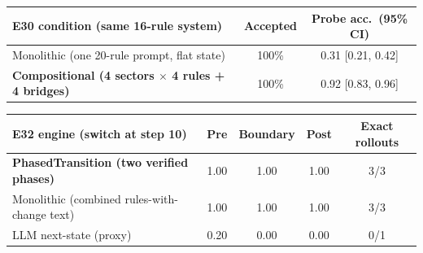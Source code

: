\begin{tabular}{lcc}
\toprule
E30 condition (same 16-rule system) & Accepted & Probe acc.\ (95\% CI) \\
\midrule
Monolithic (one 20-rule prompt, flat state) & 100\% & 0.31 [0.21, 0.42] \\
\textbf{Compositional (4 sectors $\times$ 4 rules + 4 bridges)} & 100\% & 0.92 [0.83, 0.96] \\
\bottomrule
\end{tabular}

\vspace{0.7em}

\begin{tabular}{lcccc}
\toprule
E32 engine (switch at step 10) & Pre & Boundary & Post & Exact rollouts \\
\midrule
\textbf{PhasedTransition (two verified phases)} & 1.00 & 1.00 & 1.00 & 3/3 \\
Monolithic (combined rules-with-change text) & 1.00 & 1.00 & 1.00 & 3/3 \\
LLM next-state (proxy) & 0.20 & 0.00 & 0.00 & 0/1 \\
\bottomrule
\end{tabular}

